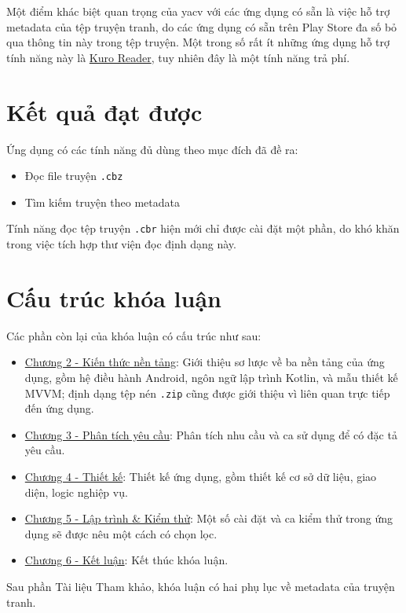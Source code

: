 \documentclass[../../thesis]{subfiles}
\begin{document}
Một điểm khác biệt quan trọng của yacv với các ứng dụng có sẵn là việc hỗ trợ
metadata của tệp truyện tranh, do các ứng dụng có sẵn trên Play Store đa số bỏ
qua thông tin này trong tệp truyện. Một trong số rất ít những ứng dụng hỗ trợ
tính năng này là \href{\KuroReader}{Kuro Reader}, tuy nhiên đây là một tính năng
trả phí.



\section{Kết quả đạt được}

Ứng dụng có các tính năng đủ dùng theo mục đích đã đề ra:

\begin{itemize}
    \item
        Đọc file truyện \texttt{.cbz}
    \item
        Tìm kiếm truyện theo metadata
\end{itemize}

Tính năng đọc tệp truyện \texttt{.cbr} hiện mới chỉ được cài đặt một
phần, do khó khăn trong việc tích hợp thư viện đọc định dạng này.



\section{Cấu trúc khóa luận}

Các phần còn lại của khóa luận có cấu trúc như sau:

\begin{itemize}
    \item
        \protect\hyperlink{P2-fundamental}{Chương 2 - Kiến thức nền tảng}: Giới
        thiệu sơ lược về ba nền tảng của ứng dụng, gồm hệ điều hành Android,
        ngôn ngữ lập trình Kotlin, và mẫu thiết kế MVVM; định dạng tệp nén
        \texttt{.zip} cũng được giới thiệu vì liên quan trực tiếp đến ứng dụng.
    \item
        \protect\hyperlink{P3-specification}{Chương 3 - Phân tích yêu cầu}: Phân
        tích nhu cầu và ca sử dụng để có đặc tả yêu cầu.
    \item
        \protect\hyperlink{P4-design}{Chương 4 - Thiết kế}: Thiết kế ứng dụng,
        gồm thiết kế cơ sở dữ liệu, giao diện, logic nghiệp vụ.
    \item
        \protect\hyperlink{P5-implementation}{Chương 5 - Lập trình \& Kiểm thử}:
        Một số cài đặt và ca kiểm thử trong ứng dụng sẽ được nêu một cách có
        chọn lọc.
    \item
        \protect\hyperlink{P6-comclusion}{Chương 6 - Kết luận}: Kết thúc khóa
        luận.
\end{itemize}

Sau phần Tài liệu Tham khảo, khóa luận có hai phụ lục về metadata của truyện
tranh.
\end{document}
